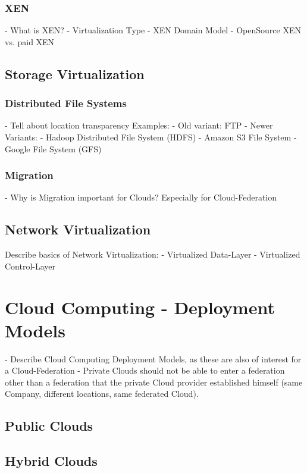 \subsubsection{XEN}
- What is XEN?
- Virtualization Type
- XEN Domain Model
- OpenSource XEN vs. paid XEN



\subsection{Storage Virtualization}
\subsubsection{Distributed File Systems}
- Tell about location transparency 
Examples: \newline
- Old variant: FTP
- Newer Variants: \newline
- Hadoop Distributed File System (HDFS)
- Amazon S3 File System
- Google File System (GFS)


\subsubsection{Migration}
- Why is Migration important for Clouds? Especially for Cloud-Federation

\subsection{Network Virtualization}
Describe basics of Network Virtualization: 
- Virtualized Data-Layer
- Virtualized Control-Layer


\section{Cloud Computing - Deployment Models}
- Describe Cloud Computing Deployment Models, as these are also of interest for a Cloud-Federation
- Private Clouds should not be able to enter a federation other than a federation that the private Cloud provider established himself (same Company, different locations, same federated Cloud).

\subsection{Public Clouds}

\subsection{Hybrid Clouds}

